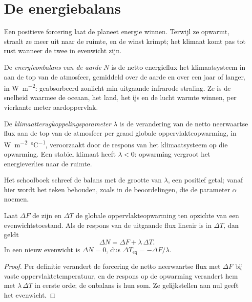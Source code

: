 \section{De energiebalans}\label{sec:b2:anthropogenic-climate-change:energy}

Een positieve forcering laat de planeet energie winnen. Terwijl ze opwarmt, straalt ze meer uit naar de ruimte, en de
winst krimpt; het klimaat komt pas tot rust wanneer de twee in evenwicht zijn.

\begin{definition}\label{def:b2:anthropogenic-climate-change:eei}
De \emph{energieonbalans van de aarde} $N$ is de netto energieflux het
klimaatsysteem in aan de top van de atmosfeer, gemiddeld over de aarde en over een jaar of langer,
in \unit{W.m^{-2}}: geabsorbeerd zonlicht min uitgaande infrarode straling. Ze is de snelheid waarmee de oceaan,
het land, het ijs en de lucht warmte winnen, per vierkante meter aardoppervlak.
\end{definition}

\begin{definition}[Klimaatterugkoppelingsparameter]\label{def:b2:anthropogenic-climate-change:lambda}
De \emph{klimaatterugkoppelingsparameter} $\lambda$ is de verandering van
de netto neerwaartse flux aan de top van de atmosfeer per graad globale oppervlakteopwarming, in
\unit{W.m^{-2}.\celsius^{-1}}, veroorzaakt door de respons van het klimaatsysteem op die opwarming. Een
stabiel klimaat heeft $\lambda < 0$: opwarming vergroot het energieverlies naar de ruimte.
\end{definition}

Het schoolboek schreef de balans met de grootte van $\lambda$, een positief getal; vanaf hier wordt het
teken behouden, zoals in de beoordelingen, die de parameter $\alpha$ noemen.

\begin{proposition}\label{prop:b2:anthropogenic-climate-change:balance}
Laat $\Delta F$ de  zijn en $\Delta T$ de globale oppervlakteopwarming
ten opzichte van een evenwichtstoestand. Als de respons van de uitgaande flux lineair is in $\Delta T$, dan geldt
\[
  \Delta N = \Delta F + \lambda\,\Delta T .
\]
In een nieuw evenwicht is $\Delta N = 0$, dus $\Delta T_{\text{eq}} = -\Delta F/\lambda$.
\end{proposition}
\begin{proof}
Per definitie verandert de forcering de netto neerwaartse flux met $\Delta F$ bij vaste
oppervlaktetemperatuur, en de respons op de opwarming verandert hem met $\lambda\,\Delta T$ in eerste orde;
de onbalans is hun som. Ze gelijkstellen aan nul geeft het evenwicht.
\end{proof}

